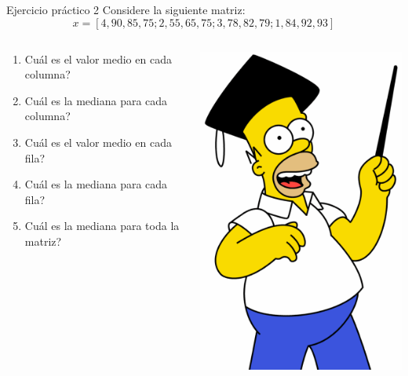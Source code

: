 \documentclass{bredelebeamer}
\begin{document}
\begin{frame}{Ejercicio práctico 2}
Considere la siguiente matriz:
\begin{equation*}
x = [4, 90, 85, 75 ; 2, 55, 65, 75 ; 3, 78, 82, 79 ; 1, 84, 92, 93]
\end{equation*}
\begin{columns}
\begin{column}{0.6\textwidth}
\begin{center}
\begin{enumerate}
\item Cuál es el valor medio en cada columna?
\item Cuál es la mediana para cada columna?
\item Cuál es el valor medio en cada fila?
\item Cuál es la mediana para cada fila?
\item Cuál es la mediana para toda la matriz?
\end{enumerate}
\end{center}
\end{column}
\begin{column}{0.4\textwidth}
\begin{center}
\includegraphics[scale=0.2]{images/img42.png}
\end{center}
\end{column}
\end{columns}
\end{frame}
\end{document}

